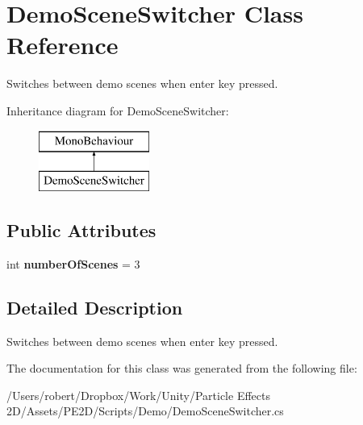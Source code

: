 \hypertarget{class_demo_scene_switcher}{}\section{Demo\+Scene\+Switcher Class Reference}
\label{class_demo_scene_switcher}


Switches between demo scenes when enter key pressed.  


Inheritance diagram for Demo\+Scene\+Switcher\+:\begin{figure}[H]
\begin{center}
\leavevmode
\includegraphics[height=2.000000cm]{class_demo_scene_switcher}
\end{center}
\end{figure}
\subsection*{Public Attributes}
\begin{DoxyCompactItemize}
\item 
\hypertarget{class_demo_scene_switcher_a761bbb8d1fbeb9f9f572f7677765dab8}{}int {\bfseries number\+Of\+Scenes} = 3\label{class_demo_scene_switcher_a761bbb8d1fbeb9f9f572f7677765dab8}

\end{DoxyCompactItemize}


\subsection{Detailed Description}
Switches between demo scenes when enter key pressed. 



The documentation for this class was generated from the following file\+:\begin{DoxyCompactItemize}
\item 
/\+Users/robert/\+Dropbox/\+Work/\+Unity/\+Particle Effects 2\+D/\+Assets/\+P\+E2\+D/\+Scripts/\+Demo/Demo\+Scene\+Switcher.\+cs\end{DoxyCompactItemize}
